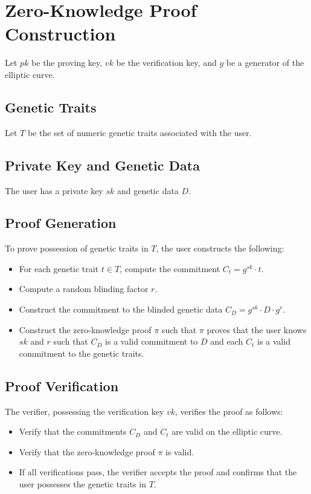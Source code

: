 \documentclass{article}
\begin{document}
\section{Zero-Knowledge Proof Construction}

Let $pk$ be the proving key, $vk$ be the verification key, and $g$ be a generator of the elliptic curve.

\subsection{Genetic Traits}

Let $T$ be the set of numeric genetic traits associated with the user.

\subsection{Private Key and Genetic Data}

The user has a private key $sk$ and genetic data $D$.

\subsection{Proof Generation}

To prove possession of genetic traits in $T$, the user constructs the following:

\begin{itemize}
    \item For each genetic trait $t \in T$, compute the commitment $C_t = g^{sk} \cdot t$.
    \item Compute a random blinding factor $r$.
    \item Construct the commitment to the blinded genetic data $C_D = g^{sk} \cdot D \cdot g^{r}$.
    \item Construct the zero-knowledge proof $\pi$ such that $\pi$ proves that the user knows $sk$ and $r$ such that $C_D$ is a valid commitment to $D$ and each $C_t$ is a valid commitment to the genetic traits.
\end{itemize}

\subsection{Proof Verification}

The verifier, possessing the verification key $vk$, verifies the proof as follows:

\begin{itemize}
    \item Verify that the commitments $C_D$ and $C_t$ are valid on the elliptic curve.
    \item Verify that the zero-knowledge proof $\pi$ is valid.
    \item If all verifications pass, the verifier accepts the proof and confirms that the user possesses the genetic traits in $T$.
\end{itemize}
\end{document}
